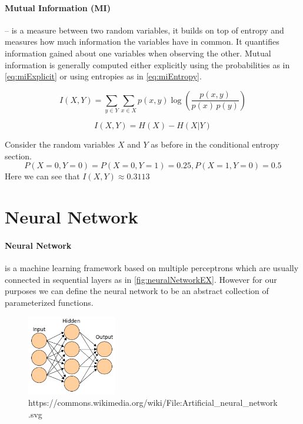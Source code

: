 \paragraph{Mutual Information (MI)}-- is a measure between two random variables,
it builds on top of entropy and measures how much information the variables have
in common. It quantifies information gained about one variables when observing
the other. Mutual information is generally computed either explicitly using the
probabilities as in \autoref{eq:miExplicit} or using entropies as in
\autoref{eq:miEntropy}.

\begin{equation}
      I(X,Y)=\sum _{y\in Y}\sum _{x\in X}{p(x,y)\log {\left({\frac
      {p(x,y)}{p(x)\,p(y)}}\right)}} 
\label{eq:miExplicit}
\end{equation}

\begin{equation}
  I(X, Y) = H(X) - H(X|Y)
\label{eq:miEntropy}
\end{equation}

Consider the random variables $X$ and $Y$ as before in the conditional entropy
section. 
$$P(X=0,Y=0) = P(X=0,Y=1) = 0.25, P(X=1,Y=0) = 0.5$$
Here we can see that $I(X,Y) \approx 0.3113$

\section{Neural Network}

\paragraph{Neural Network} is a machine learning framework based on multiple
perceptrons which are usually connected in sequential layers as in
\autoref{fig:neuralNetworkEX}. However for our purposes we can define the neural
network to be an abstract collection of parameterized functions.

\begin{figure}[H]
  \centering
  \includegraphics[width=0.35\textwidth]{figs/neural_network_ex.png}
  \caption{
    https://commons.wikimedia.org/wiki/File:Artificial\_neural\_network.svg
  }
  \label{fig:neuralNetworkEX}
\end{figure}

